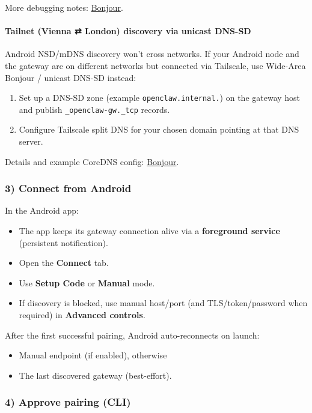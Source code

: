 More debugging notes: \href{/gateway/bonjour}{Bonjour}.

\paragraph{Tailnet (Vienna ⇄ London) discovery via unicast DNS-SD}


Android NSD/mDNS discovery won’t cross networks. If your Android node and the gateway are on different networks but connected via Tailscale, use Wide-Area Bonjour / unicast DNS-SD instead:

\begin{enumerate}
  \item Set up a DNS-SD zone (example \texttt{openclaw.internal.}) on the gateway host and publish \texttt{\_openclaw-gw.\_tcp} records.
  \item Configure Tailscale split DNS for your chosen domain pointing at that DNS server.
\end{enumerate}


Details and example CoreDNS config: \href{/gateway/bonjour}{Bonjour}.

\subsubsection{3) Connect from Android}


In the Android app:

\begin{itemize}
  \item The app keeps its gateway connection alive via a \textbf{foreground service} (persistent notification).
  \item Open the \textbf{Connect} tab.
  \item Use \textbf{Setup Code} or \textbf{Manual} mode.
  \item If discovery is blocked, use manual host/port (and TLS/token/password when required) in \textbf{Advanced controls}.
\end{itemize}


After the first successful pairing, Android auto-reconnects on launch:

\begin{itemize}
  \item Manual endpoint (if enabled), otherwise
  \item The last discovered gateway (best-effort).
\end{itemize}


\subsubsection{4) Approve pairing (CLI)}


